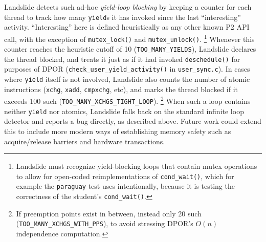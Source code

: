 Landslide detects such ad-hoc {\em yield-loop blocking}
by keeping a counter for each thread to track how many {\tt yield}s it has invoked since the last ``interesting'' activity.
``Interesting'' here is defined heuristically as any other known P2 API call,
with the exception of {\tt mutex\_lock()} and {\tt mutex\_unlock()}.%
\footnote{Landslide must recognize yield-blocking loops that contain mutex operations
to allow for open-coded reimplementations of {\tt cond\_wait()},
which for example the {\tt paraguay} test uses intentionally,
because it is testing the correctness of the student's {\tt cond\_wait()}.}
Whenever this counter reaches the heuristic cutoff of 10 ({\tt TOO\_MANY\_YIELDS}),
Landslide declares the thread blocked,
and treats it just as if it had invoked {\tt deschedule()} for purposes of DPOR
({\tt check\_user\_yield\_activity()} in {\tt user\_sync.c}).
%
In cases where {\tt yield} itself is not involved,
Landslide also counts the number of atomic instructions ({\tt xchg}, {\tt xadd}, {\tt cmpxchg}, etc),
and marks the thread blocked if it exceeds 100 such ({\tt TOO\_MANY\_XCHGS\_TIGHT\_LOOP}).%
\footnote{If preemption points exist in between, instead only 20 such ({\tt TOO\_MANY\_XCHGS\_WITH\_PPS}),
to avoid stressing DPOR's $O(n)$ independence computation.}
When such a loop contains neither {\tt yield} nor atomics,
Landslide falls back on the standard infinite loop detector and reports a bug directly, as described above.
Future work could extend this to include more modern ways of establishing memory safety such as
acquire/release barriers
and hardware transactions.

